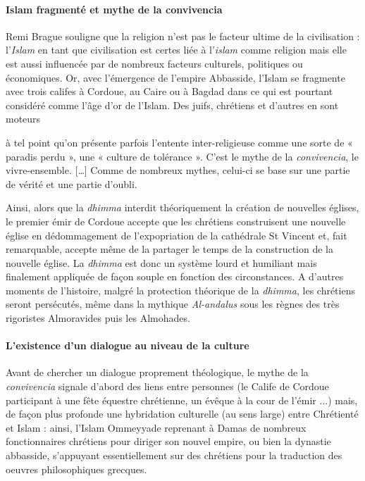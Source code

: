\paragraph{Islam fragmenté et mythe de la convivencia} Remi Brague \cite[p. 40]{brague_sur_2023} souligne que la religion n'est pas le facteur ultime de la civilisation : l'\textit{Islam} en tant que civilisation est certes liée à l'\textit{islam} comme religion mais elle est aussi influencée par de nombreux facteurs culturels, politiques ou économiques. Or, avec l'émergence de l'empire Abbasside, l'Islam se  fragmente avec trois califes à Cordoue, au Caire ou à Bagdad dans ce qui est pourtant considéré comme l'âge d'or de l'Islam. Des juifs, chrétiens et d'autres en sont moteurs 
\begin{singlequote}
  [\ldots] à tel point qu'on présente parfois l'entente inter-religieuse  comme une sorte de « paradis perdu », une « culture de tolérance ». C'est le mythe de la \textit{convivencia}, le vivre-ensemble. [\ldots] Comme de nombreux mythes, celui-ci se base sur une partie de vérité et une partie d'oubli.  \cite[p. 102]{tolan_nouvelle_2022}
\end{singlequote}
Ainsi, alors que la \textit{dhimma} interdit théoriquement la création de nouvelles églises, le premier émir de Cordoue accepte que les chrétiens construisent une nouvelle église en  dédommagement de l'expopriation de la cathédrale St Vincent et, fait remarquable, accepte même de la partager le temps de la construction de la nouvelle église. La \textit{dhimma} est donc un système lourd et humiliant mais finalement  appliquée de façon souple en fonction des circonstances. 
A d'autres moments de l'histoire, malgré la protection théorique de la \textit{dhimma}, les chrétiens seront persécutés, même dans la mythique \textit{Al-andalus} sous les règnes des très rigoristes Almoravides puis les Almohades.

\paragraph{L'existence d'un dialogue au niveau de la culture} Avant de chercher un dialogue proprement théologique, le mythe de la \textit{convivencia} signale  d'abord des liens entre personnes (le Calife de Cordoue participant à une fête équestre chrétienne, un évêque à la cour de l'émir ...) mais, de façon plus profonde une hybridation culturelle (au sens large)  entre Chrétienté et Islam : ainsi, l'Islam Ommeyyade reprenant à Damas de nombreux fonctionnaires chrétiens pour diriger son nouvel empire, ou bien la dynastie abbasside, s'appuyant essentiellement sur des chrétiens pour la traduction des oeuvres philosophiques grecques.

